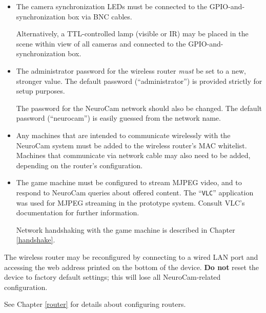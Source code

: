\begin{itemize}

\item The camera synchronization LEDs must be connected to the
GPIO-and-synchronization box via BNC cables.

Alternatively, a TTL-controlled lamp (visible or IR) may be placed in the
scene within view of all cameras and connected to the GPIO-and-synchronization
box.

\item The administrator password for the wireless router \textit{must} be
set to a new, stronger value. The default password (``administrator'') is
provided strictly for setup purposes.

The password for the NeuroCam network should also be changed. The default
password (``neurocam'') is easily guessed from the network name.

\item Any machines that are intended to communicate wirelessly with the
NeuroCam system must be added to the wireless router's MAC whitelist.
Machines that communicate via network cable may also need to be added,
depending on the router's configuration.

\item The game machine must be configured to stream MJPEG video, and to
respond to NeuroCam queries about offered content. The ``\verb+VLC+''
application was used for MJPEG streaming in the prototype system. Consult
VLC's documentation for further information.

Network handshaking with the game machine is described in Chapter 
\ref{handshake}.

\end{itemize}

The wireless router may be reconfigured by connecting to a wired LAN port
and accessing the web address printed on the bottom of the device.
\textbf{Do not} reset the device to factory default settings; this will lose 
all NeuroCam-related configuration.

See Chapter \ref{router} for details about configuring routers.

%

